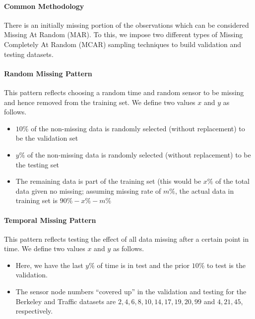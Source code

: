 \paragraph*{Common Methodology}

There is an initially missing portion of the observations which can be considered Missing At Random (MAR).
To this, we impose two different types of Missing Completely At Random (MCAR) sampling techniques to build validation and testing datasets.

\paragraph*{Random Missing Pattern}

This pattern reflects choosing a random time and random sensor to be missing and hence removed from the training set.
We define two values $x$ and $y$ as follows.

\begin{itemize}
\item $10\%$ of the non-missing data is randomly selected (without replacement) to be the validation set
\item $y\%$ of the non-missing data is randomly selected (without replacement) to be the testing set
\item The remaining data is part of the training set (this would be $x\%$ of the total data given no missing; assuming missing rate of $m\%$, the actual data in training set is $90\%-x\%-m\%$
\end{itemize}

\paragraph*{Temporal Missing Pattern}

This pattern reflects testing the effect of all data missing after a certain point in time.
We define two values $x$ and $y$ as follows.

\begin{itemize}
\item Here, we have the last $y\%$ of time is in test and the prior $10\%$ to test is the validation.
\item The sensor node numbers ``covered up'' in the validation and testing for the Berkeley and Traffic datasets are ${2,4,6,8,10,14,17,19,20,99}$ and ${4,21,45}$, respectively.
\end{itemize}

